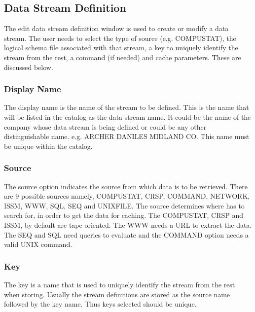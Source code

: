 \subsection{Data Stream Definition}

The edit data stream definition window is used to create or modify a
data stream. The user needs to select the type of source
(e.g. COMPUSTAT), the logical schema file associated with that
stream, a key to uniquely identify the stream from the rest, a command
(if needed) and cache parameters. These are discussed below.

\subsubsection{Display Name}

The display name is the name of the stream to be defined. This is the
name that will be listed in the catalog as the data stream name. It
could be the name of the company whose data stream is being defined or
could be any other distinguishable name.  e.g. ARCHER DANILES MIDLAND
CO. This name must be unique within the catalog.

\subsubsection{Source}

The source option indicates the source from which data is to be
retrieved. There are 9 possible sources namely, COMPUSTAT, CRSP,
COMMAND, NETWORK, ISSM, WWW, SQL, SEQ and UNIXFILE. The source
determines where \Devise has to search for, in order to get the data
for caching. The COMPUSTAT, CRSP and ISSM, by default are tape
oriented. The WWW needs a URL to extract the data. The SEQ and SQL
need queries to evaluate and the COMMAND option needs a valid UNIX
command.

\subsubsection{Key}

The key is a name that is used to uniquely identify the stream from
the rest when storing. Usually the stream definitions are stored as
the source name followed by the key name. Thus keys selected should be
unique.

